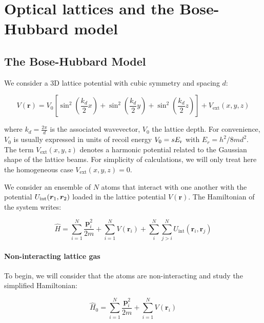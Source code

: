 \chapter{Optical lattices and the Bose-Hubbard model}


\label{sec:chapter_2}

\section{The Bose-Hubbard Model}

We consider a 3D lattice potential with cubic symmetry and spacing $d$:

\begin{equation}
    V(\bm{r})=V_{0}\left[\sin ^{2}\left(\frac{k_{d}}{2} x\right)+\sin ^{2}\left(\frac{k_{d}}{2} y\right)+\sin ^{2}\left(\frac{k_{d}}{2} z\right)\right] + V_{\mathrm{ext}} (x,y,z)
\end{equation}

\noindent where $k_d=\frac{2 \pi}{d}$ is the associated wavevector, $V_0$ the lattice depth. For convenience, $V_0$ is usually expressed in units of recoil energy $V_0 = s E_{\rm{r}}$ with $E_r=h^2/ 8 m d^2$. The term $V_{\mathrm{ext}} (x,y,z)$ denotes a harmonic potential related to the Gaussian shape of the lattice beams. For simplicity of calculations, we will only treat here  the homogeneous case $V_{\mathrm{ext}} (x,y,z)=0$.

We consider an ensemble of $N$ atoms that interact with one another with the potential $U_{\rm{int}} ( \bm{r}_1, \bm{r}_2)$ loaded in the lattice potential $V(\bm{r})$. The Hamiltonian of the system writes:

\begin{equation}
    \hat{H}=\sum_{i=1}^{N} \frac{\bm{p}_{i}^{2}}{2 m}+\sum_{i=1}^{N} V\left(\bm{r}_{i}\right) + \sum_{i}^{N} \sum_{j>i}^{N} U_{\text{int}}\left(\bm{r}_{i}, \bm{r}_{j}\right)
    \label{eq:H_lattice_full}
\end{equation}

\subsubsection{Non-interacting lattice gas}

To begin, we will consider that the atoms are non-interacting and study the simplified Hamiltonian:

\begin{equation}
    \hat{H}_0=\sum_{i=1}^{N} \frac{\bm{p}_{i}^{2}}{2 m}+\sum_{i=1}^{N} V\left(\bm{r}_{i}\right)
\end{equation}

